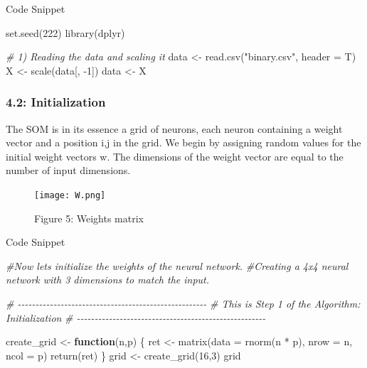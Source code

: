 \documentclass[
]{article}
\newenvironment{Shaded}{\begin{snugshade}}{\end{snugshade}}
\newcommand{\AttributeTok}[1]{\textcolor[rgb]{0.77,0.63,0.00}{#1}}
\newcommand{\CommentTok}[1]{\textcolor[rgb]{0.56,0.35,0.01}{\textit{#1}}}
\newcommand{\ControlFlowTok}[1]{\textcolor[rgb]{0.13,0.29,0.53}{\textbf{#1}}}
\newcommand{\DecValTok}[1]{\textcolor[rgb]{0.00,0.00,0.81}{#1}}
\newcommand{\FunctionTok}[1]{\textcolor[rgb]{0.00,0.00,0.00}{#1}}
\newcommand{\NormalTok}[1]{#1}
\newcommand{\OtherTok}[1]{\textcolor[rgb]{0.56,0.35,0.01}{#1}}
\newcommand{\SpecialCharTok}[1]{\textcolor[rgb]{0.00,0.00,0.00}{#1}}
\newcommand{\StringTok}[1]{\textcolor[rgb]{0.31,0.60,0.02}{#1}}
\begin{document}
Code Snippet

\begin{Shaded}
\begin{Highlighting}[]
\FunctionTok{set.seed}\NormalTok{(}\DecValTok{222}\NormalTok{)}
\FunctionTok{library}\NormalTok{(dplyr)}

\CommentTok{\# 1) Reading the data and scaling it}
\NormalTok{data }\OtherTok{\textless{}{-}} \FunctionTok{read.csv}\NormalTok{(}\StringTok{"binary.csv"}\NormalTok{, }\AttributeTok{header =}\NormalTok{ T)}
\NormalTok{X }\OtherTok{\textless{}{-}} \FunctionTok{scale}\NormalTok{(data[, }\SpecialCharTok{{-}}\DecValTok{1}\NormalTok{])}
\NormalTok{data }\OtherTok{\textless{}{-}}\NormalTok{ X}
\end{Highlighting}
\end{Shaded}

\hypertarget{initialization-1}{%
\subsubsection{4.2: Initialization}\label{initialization-1}}

The SOM is in its essence a grid of neurons, each neuron containing a
weight vector and a position i,j in the grid. We begin by assigning
random values for the initial weight vectors w. The dimensions of the
weight vector are equal to the number of input dimensions.

\begin{figure}
\centering
\texttt{[image: W.png]}
\caption{Figure 5: Weights matrix}
\end{figure}

Code Snippet

\begin{Shaded}
\begin{Highlighting}[]
\CommentTok{\#Now lets initialize the weights of the neural network.}
\CommentTok{\#Creating a 4x4 neural network with 3 dimensions to match the input.}

\CommentTok{\# {-}{-}{-}{-}{-}{-}{-}{-}{-}{-}{-}{-}{-}{-}{-}{-}{-}{-}{-}{-}{-}{-}{-}{-}{-}{-}{-}{-}{-}{-}{-}{-}{-}{-}{-}{-}{-}{-}{-}{-}{-}{-}{-}{-}{-}{-}{-}{-}{-}{-}{-}{-}{-}}
\CommentTok{\# This is Step 1 of the Algorithm: Initialization}
\CommentTok{\# {-}{-}{-}{-}{-}{-}{-}{-}{-}{-}{-}{-}{-}{-}{-}{-}{-}{-}{-}{-}{-}{-}{-}{-}{-}{-}{-}{-}{-}{-}{-}{-}{-}{-}{-}{-}{-}{-}{-}{-}{-}{-}{-}{-}{-}{-}{-}{-}{-}{-}{-}{-}{-}}

\NormalTok{create\_grid }\OtherTok{\textless{}{-}} \ControlFlowTok{function}\NormalTok{(n,p) \{}
\NormalTok{  ret }\OtherTok{\textless{}{-}} \FunctionTok{matrix}\NormalTok{(}\AttributeTok{data =} \FunctionTok{rnorm}\NormalTok{(n }\SpecialCharTok{*}\NormalTok{ p), }\AttributeTok{nrow =}\NormalTok{ n, }\AttributeTok{ncol =}\NormalTok{ p)}
  \FunctionTok{return}\NormalTok{(ret)}
\NormalTok{\}}
\NormalTok{grid }\OtherTok{\textless{}{-}} \FunctionTok{create\_grid}\NormalTok{(}\DecValTok{16}\NormalTok{,}\DecValTok{3}\NormalTok{)}
\NormalTok{grid}
\end{Highlighting}
\end{Shaded}
\end{document}
